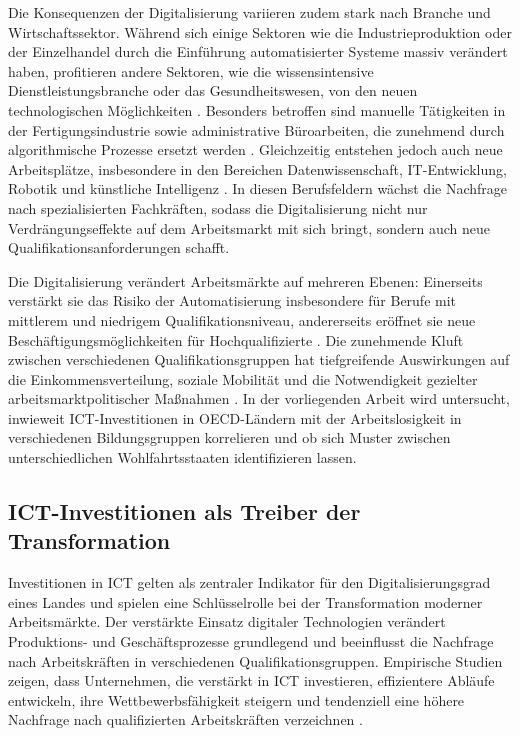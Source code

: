 Die Konsequenzen der Digitalisierung variieren zudem stark nach Branche und 
Wirtschaftssektor. Während sich einige Sektoren wie die Industrieproduktion oder der 
Einzelhandel durch die Einführung automatisierter Systeme massiv verändert haben, 
profitieren andere Sektoren, wie die wissensintensive Dienstleistungsbranche oder das 
Gesundheitswesen, von den neuen technologischen Möglichkeiten 
\parencite[S. 1555]{autor2013thegrowth}. Besonders betroffen sind manuelle Tätigkeiten in 
der Fertigungsindustrie sowie administrative Büroarbeiten, die zunehmend durch 
algorithmische Prozesse ersetzt werden \parencite[S. 260]{frey2016thefuture}. 
Gleichzeitig entstehen jedoch auch neue Arbeitsplätze, insbesondere in den Bereichen 
Datenwissenschaft, IT-Entwicklung, Robotik und künstliche Intelligenz 
\parencite[S. 2510]{goos2014explaining}. In diesen Berufsfeldern wächst die Nachfrage nach 
spezialisierten Fachkräften, sodass die Digitalisierung nicht nur Verdrängungseffekte auf 
dem Arbeitsmarkt mit sich bringt, sondern auch neue Qualifikationsanforderungen schafft.

Die Digitalisierung verändert Arbeitsmärkte auf mehreren Ebenen: Einerseits verstärkt sie 
das Risiko der Automatisierung insbesondere für Berufe mit mittlerem und niedrigem 
Qualifikationsniveau, andererseits eröffnet sie neue Beschäftigungsmöglichkeiten für 
Hochqualifizierte \parencite[S. 1555]{autor2013thegrowth}. Die zunehmende Kluft zwischen 
verschiedenen Qualifikationsgruppen hat tiefgreifende Auswirkungen auf die 
Einkommensverteilung, soziale Mobilität und die Notwendigkeit gezielter 
arbeitsmarktpolitischer Maßnahmen \parencite[S. 2510]{goos2014explaining}. In der 
vorliegenden Arbeit wird untersucht, inwieweit \ac{ICT}-Investitionen in OECD-Ländern mit 
der Arbeitslosigkeit in verschiedenen Bildungsgruppen korrelieren und ob sich Muster 
zwischen unterschiedlichen Wohlfahrtsstaaten identifizieren lassen.


\subsection{ICT-Investitionen als Treiber der Transformation}

Investitionen in \ac{ICT} gelten als zentraler Indikator für den 
Digitalisierungsgrad eines Landes und spielen eine Schlüsselrolle bei der Transformation 
moderner Arbeitsmärkte. Der verstärkte Einsatz digitaler Technologien verändert 
Produktions- und Geschäftsprozesse grundlegend und beeinflusst die Nachfrage nach 
Arbeitskräften in verschiedenen Qualifikationsgruppen. Empirische Studien zeigen, dass 
Unternehmen, die verstärkt in \ac{ICT} investieren, effizientere Abläufe entwickeln, ihre 
Wettbewerbsfähigkeit steigern und tendenziell eine höhere Nachfrage nach qualifizierten 
Arbeitskräften verzeichnen \parencite[S. 12]{corrado2018intangible}.

